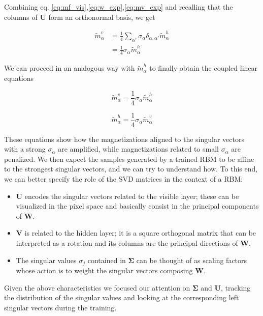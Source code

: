 \documentclass{revtex4-1}
\begin{document}
Combining eq. \eqref{eq:mf_vis},\eqref{eq:w_exp},\eqref{eq:mv_exp} and recalling that the columns of \(\mathbf{U}\) form an orthonormal basis, we get

\begin{align*}
\tilde{m}_{\alpha}^v & = \frac{1}{4} \sum_{\alpha '} \sigma_{\alpha} \delta_{\alpha,\alpha '} \tilde{m}_{\alpha}^h \\ \nonumber
& = \frac{1}{4} \sigma_{\alpha} \tilde{m}_{\alpha}^h \nonumber
\end{align*}

We can proceed in an analogous way with \(\tilde{m}_{\alpha}^h\) to finally obtain the coupled linear equations

\begin{equation}
\tilde{m}_{\alpha}^v = \frac{1}{4} \sigma_{\alpha} \tilde{m}_{\alpha}^h
\end{equation}

\begin{equation}
\tilde{m}_{\alpha}^h = \frac{1}{4} \sigma_{\alpha} \tilde{m}_{\alpha}^v
\end{equation}

These equations show how the magnetizations aligned to the singular vectors with a strong \(\sigma_{\alpha}\) are amplified, while magnetizations related to small \(\sigma_{\alpha}\) are penalized. We then expect the samples generated by a trained RBM to be affine to the strongest singular vectors, and we can try to understand how. To this end, we can better specify the role of the SVD matrices in the context of a RBM:

\begin{itemize}
\item \(\mathbf{U}\) encodes the singular vectors related to the visible layer; these can be visualized in the pixel space and basically consist in the principal components of \(\mathbf{W}\).
\item  \(\mathbf{V}\) is related to the hidden layer; it is a square orthogonal matrix that can be interpreted as a rotation and its columns are the principal directions of \(\mathbf{W}\).
\item The singular values \( {\sigma}_j \) contained in \(\mathbf{\Sigma}\) can be thought of as scaling factors whose action is to weight the singular vectors composing \(\mathbf{W}\).
\end{itemize}

Given the above characteristics we focused our attention on \(\mathbf{\Sigma}\) and \(\mathbf{U}\), tracking the distribution of the singular values and looking at the corresponding left singular vectors during the training.
\end{document}
